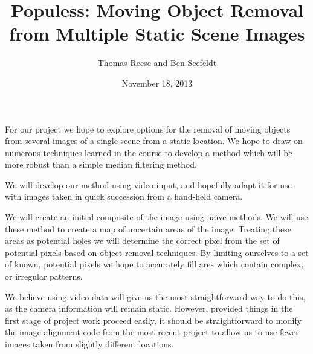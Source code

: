 \documentclass{article}
\author{Thomas Reese and Ben Seefeldt}
\date{November 18, 2013}
\title{Populess: Moving Object Removal from Multiple Static Scene Images}
\begin{document}
\maketitle
\doublespacing

For our project we hope to explore options for the removal of moving objects
from several images of a single scene from a static location. We hope to draw on
numerous techniques learned in the course to develop a method which will be more
robust than a simple median filtering method.

We will develop our method using video input, and hopefully adapt it for use
with images taken in quick succession from a hand-held camera.

We will create an initial composite of the image using na\"ive methods. We will
use these method to create a map of uncertain areas of the image. Treating these
areas as potential holes we will determine the correct pixel from the set of
potential pixels based on object removal techniques. By limiting ourselves to a
set of known, potential pixels we hope to accurately fill ares which contain
complex, or irregular patterns.

We believe using video data will give us the most straightforward way to do
this, as the camera information will remain static. However, provided things in
the first stage of project work proceed easily, it should be straightforward to
modify the image alignment code from the most recent project to allow us to use
fewer images taken from slightly different locations. 
\end{document}
